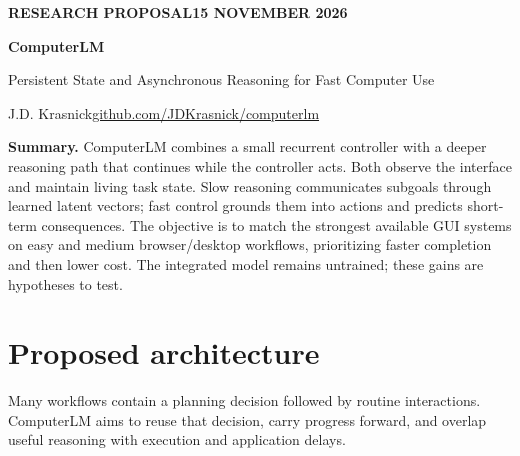 \documentclass[11pt,letterpaper]{article}
\begin{document}
\thispagestyle{empty}
{\small\bfseries\color{accent}RESEARCH PROPOSAL\hfill 15 NOVEMBER 2026}
\vspace{8pt}

{\LARGE\bfseries\color{ink}ComputerLM\par}
{\large Persistent State and Asynchronous Reasoning for Fast Computer Use\par}
\vspace{4pt}
J.D. Krasnick\hfill\href{https://github.com/JDKrasnick/computerlm}{github.com/JDKrasnick/computerlm}

\textbf{Summary.} ComputerLM combines a small recurrent controller with a deeper reasoning path that continues while the controller acts. Both observe the interface and maintain living task state. Slow reasoning communicates subgoals through learned latent vectors; fast control grounds them into actions and predicts short-term consequences. The objective is to match the strongest available GUI systems on easy and medium browser/desktop workflows, prioritizing faster completion and then lower cost. The integrated model remains untrained; these gains are hypotheses to test.

\section{Proposed architecture}
Many workflows contain a planning decision followed by routine interactions. ComputerLM aims to reuse that decision, carry progress forward, and overlap useful reasoning with execution and application delays.

\begin{figure}[h!]
\centering
{}
\end{figure}
\end{document}
